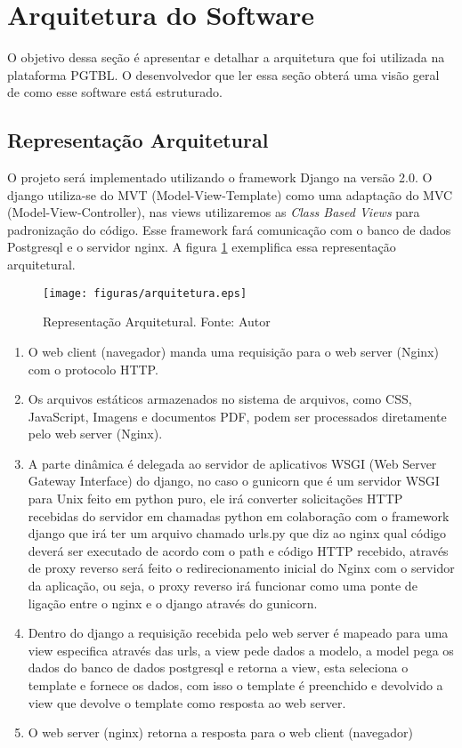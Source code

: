 \section{Arquitetura do Software}

O objetivo dessa seção é apresentar e detalhar a arquitetura que foi utilizada na plataforma PGTBL. O desenvolvedor que
ler essa seção obterá uma visão geral de como esse software está estruturado.

\subsection{Representação Arquitetural}

O projeto será implementado utilizando o framework Django na versão 2.0. O django utiliza-se do MVT (Model-View-Template) como uma adaptação do MVC (Model-View-Controller), nas views utilizaremos as \textit{Class Based Views} para padronização do código. Esse framework fará comunicação com o banco de dados Postgresql e o servidor nginx.  A figura \ref{fig:arquitetura} exemplifica essa representação arquitetural.

\begin{figure}[h!]
	\centering
  \texttt{[image: figuras/arquitetura.eps]}
  \caption[Representação Arquitetural.]{Representação Arquitetural. Fonte: Autor}
	\label{fig:arquitetura}
\end{figure}

\begin{enumerate}
  \item O web client (navegador) manda uma requisição para o web server (Nginx) com o protocolo HTTP.
  \item Os arquivos estáticos armazenados no sistema de arquivos, como CSS, JavaScript, Imagens e documentos PDF,
    podem ser processados diretamente pelo web server (Nginx).
  \item A parte dinâmica é delegada ao servidor de aplicativos WSGI (Web Server Gateway Interface) do django, no caso
    o gunicorn que é um servidor WSGI para Unix feito em python puro, ele irá converter solicitações HTTP recebidas
    do servidor em chamadas python em colaboração com o framework django que irá ter um arquivo chamado urls.py que
    diz ao nginx qual código deverá ser executado de acordo com o path e código HTTP recebido, através de proxy
    reverso será feito o redirecionamento inicial do Nginx com o servidor da aplicação, ou seja, o proxy reverso
    irá funcionar como uma ponte de ligação entre o nginx e o django através do gunicorn.
  \item Dentro do django a requisição recebida pelo web server é mapeado para uma view especifica através das urls,
    a view pede dados a modelo, a model pega os dados do banco de dados postgresql e retorna a view, esta seleciona
    o template e fornece os dados, com isso o template é preenchido e devolvido a view que devolve o template como
    resposta ao web server.
  \item O web server (nginx) retorna a resposta para o web client (navegador)
\end{enumerate}

